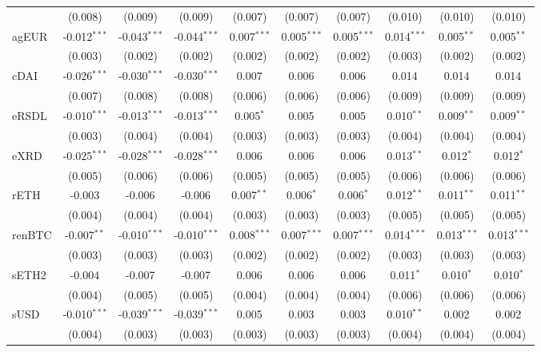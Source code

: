 \begin{table}[!htbp]
\begin{tabular}{@{\extracolsep{5pt}}lccccccccc}
  & (0.008) & (0.009) & (0.009) & (0.007) & (0.007) & (0.007) & (0.010) & (0.010) & (0.010) \\
 agEUR & -0.012$^{***}$ & -0.043$^{***}$ & -0.044$^{***}$ & 0.007$^{***}$ & 0.005$^{***}$ & 0.005$^{***}$ & 0.014$^{***}$ & 0.005$^{**}$ & 0.005$^{**}$ \\
  & (0.003) & (0.002) & (0.002) & (0.002) & (0.002) & (0.002) & (0.003) & (0.002) & (0.002) \\
 cDAI & -0.026$^{***}$ & -0.030$^{***}$ & -0.030$^{***}$ & 0.007$^{}$ & 0.006$^{}$ & 0.006$^{}$ & 0.014$^{}$ & 0.014$^{}$ & 0.014$^{}$ \\
  & (0.007) & (0.008) & (0.008) & (0.006) & (0.006) & (0.006) & (0.009) & (0.009) & (0.009) \\
 eRSDL & -0.010$^{***}$ & -0.013$^{***}$ & -0.013$^{***}$ & 0.005$^{*}$ & 0.005$^{}$ & 0.005$^{}$ & 0.010$^{**}$ & 0.009$^{**}$ & 0.009$^{**}$ \\
  & (0.003) & (0.004) & (0.004) & (0.003) & (0.003) & (0.003) & (0.004) & (0.004) & (0.004) \\
 eXRD & -0.025$^{***}$ & -0.028$^{***}$ & -0.028$^{***}$ & 0.006$^{}$ & 0.006$^{}$ & 0.006$^{}$ & 0.013$^{**}$ & 0.012$^{*}$ & 0.012$^{*}$ \\
  & (0.005) & (0.006) & (0.006) & (0.005) & (0.005) & (0.005) & (0.006) & (0.006) & (0.006) \\
 rETH & -0.003$^{}$ & -0.006$^{}$ & -0.006$^{}$ & 0.007$^{**}$ & 0.006$^{*}$ & 0.006$^{*}$ & 0.012$^{**}$ & 0.011$^{**}$ & 0.011$^{**}$ \\
  & (0.004) & (0.004) & (0.004) & (0.003) & (0.003) & (0.003) & (0.005) & (0.005) & (0.005) \\
 renBTC & -0.007$^{**}$ & -0.010$^{***}$ & -0.010$^{***}$ & 0.008$^{***}$ & 0.007$^{***}$ & 0.007$^{***}$ & 0.014$^{***}$ & 0.013$^{***}$ & 0.013$^{***}$ \\
  & (0.003) & (0.003) & (0.003) & (0.002) & (0.002) & (0.002) & (0.003) & (0.003) & (0.003) \\
 sETH2 & -0.004$^{}$ & -0.007$^{}$ & -0.007$^{}$ & 0.006$^{}$ & 0.006$^{}$ & 0.006$^{}$ & 0.011$^{*}$ & 0.010$^{*}$ & 0.010$^{*}$ \\
  & (0.004) & (0.005) & (0.005) & (0.004) & (0.004) & (0.004) & (0.006) & (0.006) & (0.006) \\
 sUSD & -0.010$^{***}$ & -0.039$^{***}$ & -0.039$^{***}$ & 0.005$^{}$ & 0.003$^{}$ & 0.003$^{}$ & 0.010$^{**}$ & 0.002$^{}$ & 0.002$^{}$ \\
  & (0.004) & (0.003) & (0.003) & (0.003) & (0.003) & (0.003) & (0.004) & (0.004) & (0.004) \\

\end{tabular}
\end{table}

